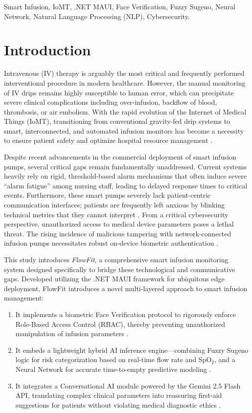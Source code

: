 \documentclass[journal]{IEEEtran}
\begin{document}
\begin{IEEEkeywords}
Smart Infusion, IoMT, .NET MAUI, Face Verification, Fuzzy Sugeno, Neural Network, Natural Language Processing (NLP), Cybersecurity.
\end{IEEEkeywords}

\section{Introduction}
Intravenous (IV) therapy is arguably the most critical and frequently performed interventional procedure in modern healthcare. However, the manual monitoring of IV drips remains highly susceptible to human error, which can precipitate severe clinical complications including over-infusion, backflow of blood, thrombosis, or air embolism. With the rapid evolution of the Internet of Medical Things (IoMT), transitioning from conventional gravity-fed drip systems to smart, interconnected, and automated infusion monitors has become a necessity to ensure patient safety and optimize hospital resource management \cite{Silva2022_2, Salmaz2021_8, Wang2023_27}.

Despite recent advancements in the commercial deployment of smart infusion pumps, several critical gaps remain fundamentally unaddressed. Current systems heavily rely on rigid, threshold-based alarm mechanisms that often induce severe ``alarm fatigue'' among nursing staff, leading to delayed response times to critical events. Furthermore, these smart pumps severely lack patient-centric communication interfaces; patients are frequently left anxious by blinking technical metrics that they cannot interpret \cite{Seol2023_5, Hegde2026_7}. From a critical cybersecurity perspective, unauthorized access to medical device parameters poses a lethal threat. The rising incidence of malicious tampering with network-connected infusion pumps necessitates robust on-device biometric authentication \cite{Stergiopoulos2023_6, Bresch2020_12}.

This study introduces \textit{FlowFit}, a comprehensive smart infusion monitoring system designed specifically to bridge these technological and communicative gaps. Developed utilizing the .NET MAUI framework for ubiquitous edge deployment, FlowFit introduces a novel multi-layered approach to smart infusion management:
\begin{enumerate}
    \item It implements a biometric Face Verification protocol to rigorously enforce Role-Based Access Control (RBAC), thereby preventing unauthorized manipulation of infusion parameters \cite{Trivedi2025_18}.
    \item It embeds a lightweight hybrid AI inference engine—combining Fuzzy Sugeno logic for risk categorization based on real-time flow rate and SpO$_2$, and a Neural Network for accurate time-to-empty predictive modeling \cite{Wu2026_55, Zhao2024_73}.
    \item It integrates a Conversational AI module powered by the Gemini 2.5 Flash API, translating complex clinical parameters into reassuring first-aid suggestions for patients without violating medical diagnostic ethics \cite{Pandya2026_14}.
\end{enumerate}
\end{document}
